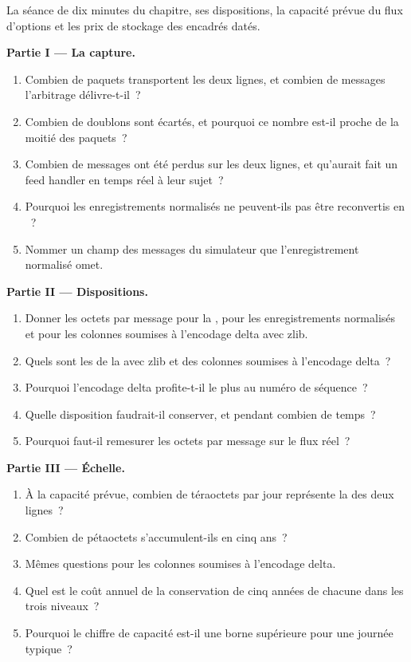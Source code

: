 \begin{problem}\label{pb:pl:capturing-and-storing-tick-data:1}
La séance de dix minutes du chapitre, ses dispositions, la capacité prévue du flux d'options et les prix de stockage des
encadrés datés.

\medskip\noindent\textbf{Partie I --- La capture.}
\begin{enumerate}
\item Combien de paquets transportent les deux lignes, et combien de messages l'arbitrage délivre-t-il~?
\item Combien de doublons sont écartés, et pourquoi ce nombre est-il proche de la moitié des paquets~?
\item Combien de messages ont été perdus sur les deux lignes, et qu'aurait fait un feed handler en temps réel à leur sujet~?
\item Pourquoi les enregistrements normalisés ne peuvent-ils pas être reconvertis en ~?
\item Nommer un champ des messages du simulateur que l'enregistrement normalisé omet.
\end{enumerate}

\medskip\noindent\textbf{Partie II --- Dispositions.}
\begin{enumerate}[resume]
\item Donner les octets par message pour la , pour les enregistrements normalisés et pour les colonnes soumises à l'encodage delta avec zlib.
\item Quels sont les  de la  avec zlib et des colonnes soumises à l'encodage delta~?
\item Pourquoi l'encodage delta profite-t-il le plus au numéro de séquence~?
\item Quelle disposition faudrait-il conserver, et pendant combien de temps~?
\item Pourquoi faut-il remesurer les octets par message sur le flux réel~?
\end{enumerate}

\medskip\noindent\textbf{Partie III --- Échelle.}
\begin{enumerate}[resume]
\item À la capacité prévue, combien de téraoctets par jour représente la  des deux lignes~?
\item Combien de pétaoctets s'accumulent-ils en cinq ans~?
\item Mêmes questions pour les colonnes soumises à l'encodage delta.
\item Quel est le coût annuel de la conservation de cinq années de chacune dans les trois niveaux~?
\item Pourquoi le chiffre de capacité est-il une borne supérieure pour une journée typique~?
\end{enumerate}


\end{problem}
